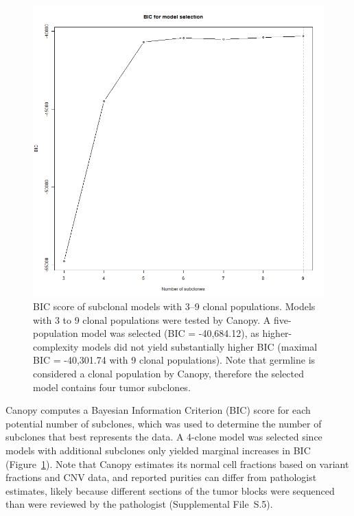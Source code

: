 \begin{figure}[htp]
	\centering
	\includegraphics[width=0.7\linewidth,keepaspectratio]{images/240/bic}
	\caption[BIC scores of subclonal models with 3--9 clonal populations.]{BIC score of subclonal models with 3--9 clonal populations. Models with 3 to 9 clonal populations were tested by Canopy. A five-population model was selected (BIC = -40,684.12), as higher-complexity models did not yield substantially higher BIC (maximal BIC = -40,301.74 with 9 clonal populations). Note that germline is considered a clonal population by Canopy, therefore the selected model contains four tumor subclones.}
	\label{fig:240:bic}
\end{figure}
Canopy computes a Bayesian Information Criterion \cite{schwarz1978} (BIC) score for each potential number of subclones, which was used to determine the number of subclones that best represents the data. A 4-clone model was selected since models with additional subclones only yielded marginal increases in BIC (Figure~\ref{fig:240:bic}). Note that Canopy estimates its normal cell fractions based on variant fractions and CNV data, and reported purities can differ from pathologist estimates, likely because different sections of the tumor blocks were sequenced than were reviewed by the pathologist (Supplemental File~S\thechapter{}.5).

